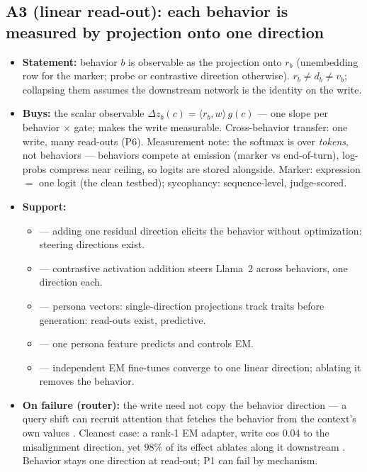 \documentclass[11pt]{article}
\newcommand{\vb}{v_b}
\begin{document}
\subsection*{A3 (linear read-out): each behavior is measured by projection onto one direction}

\begin{itemize}
\item \textbf{Statement:} behavior $b$ is observable as the projection onto $r_b$ (unembedding row for the marker; probe or contrastive direction otherwise). $r_b \neq d_b \neq \vb$; collapsing them assumes the downstream network is the identity on the write.
\item \textbf{Buys:} the scalar observable $\Delta z_b(c) = \langle r_b, w \rangle\, g(c)$ --- one slope per behavior $\times$ gate; makes the write measurable. Cross-behavior transfer: one write, many read-outs (P6). Measurement note: the softmax is over \emph{tokens}, not behaviors --- behaviors compete at emission (marker vs end-of-turn), log-probs compress near ceiling, so logits are stored alongside. Marker: expression $=$ one logit (the clean testbed); sycophancy: sequence-level, judge-scored.
\item \textbf{Support:}
  \begin{itemize}
  \item \cite{turner2023} --- adding one residual direction elicits the behavior without optimization: steering directions exist.
  \item \cite{panickssery2023} --- contrastive activation addition steers Llama~2 across behaviors, one direction each.
  \item \cite{chen2025} --- persona vectors: single-direction projections track traits before generation: read-outs exist, predictive.
  \item \cite{wang2025} --- one persona feature predicts and controls EM.
  \item \cite{soligo2025} --- independent EM fine-tunes converge to one linear direction; ablating it removes the behavior.
  \end{itemize}
\item \textbf{On failure (router):} the write need not copy the behavior direction --- a query shift can recruit attention that fetches the behavior from the context's own values \cite{engels2025}. Cleanest case: a rank-1 EM adapter, write cos $0.04$ to the misalignment direction, yet $98\%$ of its effect ablates along it downstream \cite{soligo2025}. Behavior stays one direction at read-out; P1 can fail by mechanism.
\end{itemize}
\end{document}
